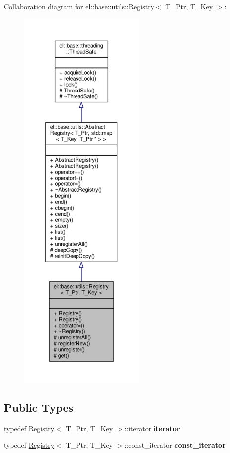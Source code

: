 Collaboration diagram for el\+:\+:base\+:\+:utils\+:\+:Registry$<$ T\+\_\+\+Ptr, T\+\_\+\+Key $>$\+:
\nopagebreak
\begin{figure}[H]
\begin{center}
\leavevmode
\includegraphics[height=550pt]{d4/d26/classel_1_1base_1_1utils_1_1Registry__coll__graph}
\end{center}
\end{figure}
\subsection*{Public Types}
\begin{DoxyCompactItemize}
\item 
typedef \hyperlink{classel_1_1base_1_1utils_1_1Registry}{Registry}$<$ T\+\_\+\+Ptr, T\+\_\+\+Key $>$\+::iterator {\bfseries iterator}\hypertarget{classel_1_1base_1_1utils_1_1Registry_a31f3d725285e6b65f1f9e990066f96ed}{}\label{classel_1_1base_1_1utils_1_1Registry_a31f3d725285e6b65f1f9e990066f96ed}

\item 
typedef \hyperlink{classel_1_1base_1_1utils_1_1Registry}{Registry}$<$ T\+\_\+\+Ptr, T\+\_\+\+Key $>$\+::const\+\_\+iterator {\bfseries const\+\_\+iterator}\hypertarget{classel_1_1base_1_1utils_1_1Registry_a955e62adc74c60d0205b52a3fc430cef}{}\label{classel_1_1base_1_1utils_1_1Registry_a955e62adc74c60d0205b52a3fc430cef}

\end{DoxyCompactItemize}
